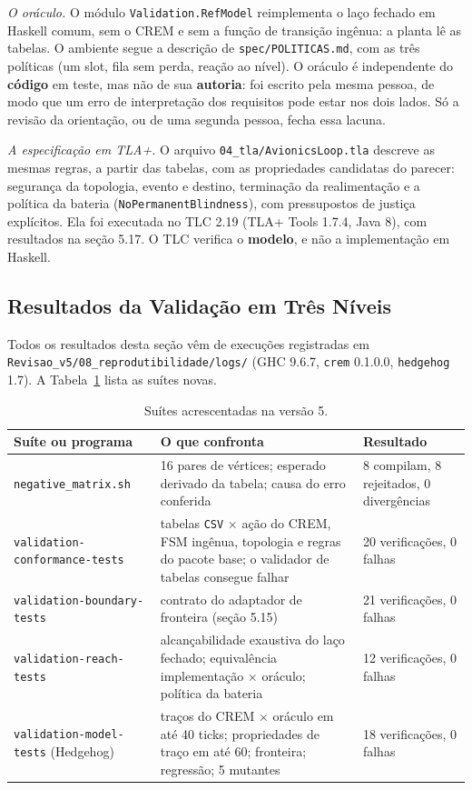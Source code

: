 \documentclass[12pt,a4paper]{article}
\begin{document}
\textit{O oráculo.} O módulo \texttt{Validation.RefModel} reimplementa o laço fechado em Haskell comum, sem o CREM e sem a função de transição ingênua: a planta lê as tabelas. O ambiente segue a descrição de \texttt{spec/POLITICAS.md}, com as três políticas (um slot, fila sem perda, reação ao nível). O oráculo é independente do \textbf{código} em teste, mas não de sua \textbf{autoria}: foi escrito pela mesma pessoa, de modo que um erro de interpretação dos requisitos pode estar nos dois lados. Só a revisão da orientação, ou de uma segunda pessoa, fecha essa lacuna.

\textit{A especificação em TLA+.} O arquivo \texttt{04\_tla/AvionicsLoop.tla} descreve as mesmas regras, a partir das tabelas, com as propriedades candidatas do parecer: segurança da topologia, evento e destino, terminação da realimentação e a política da bateria (\texttt{NoPermanentBlindness}), com pressupostos de justiça explícitos. Ela foi executada no TLC 2.19 (TLA+ Tools 1.7.4, Java 8), com resultados na seção 5.17. O TLC verifica o \textbf{modelo}, e não a implementação em Haskell.

\subsection{Resultados da Validação em Três Níveis}

Todos os resultados desta seção vêm de execuções registradas em \texttt{Revisao\_v5/08\_reprodutibilidade/logs/} (GHC 9.6.7, \texttt{crem} 0.1.0.0, \texttt{hedgehog} 1.7). A Tabela~\ref{tab:suites} lista as suítes novas.

\begin{table}[h]
\centering
\footnotesize
\begin{tabular}{|p{5.5cm}|p{5.5cm}|p{2.9cm}|}
\hline
Suíte ou programa & O que confronta & Resultado \\
\hline
\texttt{negative\_matrix.sh} & 16 pares de vértices; esperado derivado da tabela; causa do erro conferida & 8 compilam, 8 rejeitados, 0 divergências \\
\hline
\texttt{validation-\allowbreak conformance-tests} & tabelas \texttt{CSV} $\times$ ação do CREM, FSM ingênua, topologia e regras do pacote base; o validador de tabelas consegue falhar & 20 verificações, 0 falhas \\
\hline
\texttt{validation-\allowbreak boundary-tests} & contrato do adaptador de fronteira (seção 5.15) & 21 verificações, 0 falhas \\
\hline
\texttt{validation-\allowbreak reach-tests} & alcançabilidade exaustiva do laço fechado; equivalência implementação $\times$ oráculo; política da bateria & 12 verificações, 0 falhas \\
\hline
\texttt{validation-\allowbreak model-tests} (Hedgehog) & traços do CREM $\times$ oráculo em até 40 ticks; propriedades de traço em até 60; fronteira; regressão; 5 mutantes & 18 verificações, 0 falhas \\
\hline
\end{tabular}
\caption{Suítes acrescentadas na versão 5.}
\label{tab:suites}
\end{table}
\end{document}
